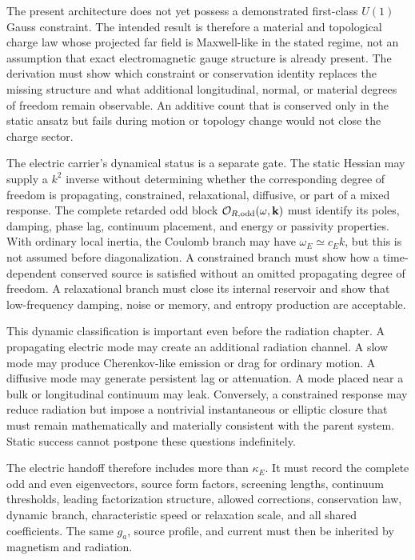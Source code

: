 The present architecture does not yet possess a demonstrated first-class
\(U(1)\) Gauss constraint. The intended result is therefore a material and
topological charge law whose projected far field is Maxwell-like in the stated
regime, not an assumption that exact electromagnetic gauge structure is already
present. The derivation must show which constraint or conservation identity
replaces the missing structure and what additional longitudinal, normal, or
material degrees of freedom remain observable. An additive count that is
conserved only in the static ansatz but fails during motion or topology change
would not close the charge sector.

The electric carrier's dynamical status is a separate gate. The static Hessian
may supply a \(k^2\) inverse without determining whether the corresponding
degree of freedom is propagating, constrained, relaxational, diffusive, or part
of a mixed response. The complete retarded odd block
\(\mathcal O_{R,{\rm odd}}(\omega,\mathbf k)\) must identify its poles, damping,
phase lag, continuum placement, and energy or passivity properties. With
ordinary local inertia, the Coulomb branch may have
\(\omega_E\simeq c_Ek\), but this is not assumed before diagonalization. A
constrained branch must show how a time-dependent conserved source is satisfied
without an omitted propagating degree of freedom. A relaxational branch must
close its internal reservoir and show that low-frequency damping, noise or
memory, and entropy production are acceptable.

This dynamic classification is important even before the radiation chapter.
A propagating electric mode may create an additional radiation channel. A slow
mode may produce Cherenkov-like emission or drag for ordinary motion. A
diffusive mode may generate persistent lag or attenuation. A mode placed near a
bulk or longitudinal continuum may leak. Conversely, a constrained response
may reduce radiation but impose a nontrivial instantaneous or elliptic closure
that must remain mathematically and materially consistent with the parent
system. Static success cannot postpone these questions indefinitely.

The electric handoff therefore includes more than \(\kappa_E\). It must record
the complete odd and even eigenvectors, source form factors, screening lengths,
continuum thresholds, leading factorization structure, allowed corrections,
conservation law, dynamic branch, characteristic speed or relaxation scale,
and all shared coefficients. The same \(g_a\), source profile, and current must
then be inherited by magnetism and radiation.

